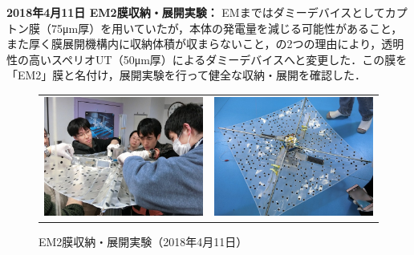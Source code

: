 \noindent \textbf{2018年4月11日 EM2膜収納・展開実験：} EMまではダミーデバイスとしてカプトン膜（75μm厚）を用いていたが，本体の発電量を減じる可能性があること，また厚く膜展開機構内に収納体積が収まらないこと，の2つの理由により，透明性の高いスペリオUT（50μm厚）によるダミーデバイスへと変更した．この膜を「EM2」膜と名付け，展開実験を行って健全な収納・展開を確認した．
\begin{figure}[H]
	\centering
	\begin{tabular}{cc}
		\begin{minipage}{0.5\hsize}
			\begin{center}
				\includegraphics[width=1\textwidth]{03/fig/3-9-3-1-16.jpg}
			\end{center}
		\end{minipage}&
		\begin{minipage}{0.5\hsize}
			\begin{center}
				\includegraphics[width=1\textwidth]{03/fig/3-9-3-1-17.jpg}
			\end{center}
		\end{minipage}
	\end{tabular}
	\caption{EM2膜収納・展開実験（2018年4月11日）}
	\label{fig3-9-3-1-16}
\end{figure}

